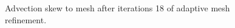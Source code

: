 \begin{figure}[!h]
\centering
{}
\caption{Advection skew to mesh after iterations 18 of adaptive mesh refinement.}
\end{figure}

